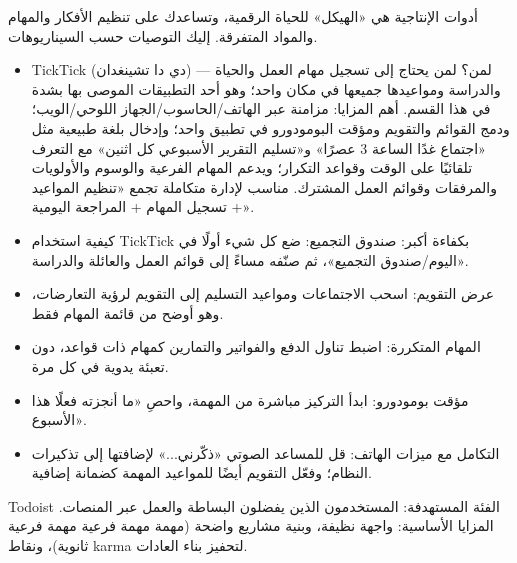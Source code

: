 


أدوات الإنتاجية هي «الهيكل» للحياة الرقمية، وتساعدك على تنظيم الأفكار والمهام والمواد المتفرقة. إليك التوصيات حسب السيناريوهات.


\begin{itemize}
  \item TickTick (دي دا تشينغدان) — لمن؟ لمن يحتاج إلى تسجيل مهام العمل والحياة والدراسة ومواعيدها جميعها في مكان واحد؛ وهو أحد التطبيقات الموصى بها بشدة في هذا القسم. أهم المزايا: مزامنة عبر الهاتف/الحاسوب/الجهاز اللوحي/الويب؛ ودمج القوائم والتقويم ومؤقت البومودورو في تطبيق واحد؛ وإدخال بلغة طبيعية مثل «اجتماع غدًا الساعة 3 عصرًا» و«تسليم التقرير الأسبوعي كل اثنين» مع التعرف تلقائيًا على الوقت وقواعد التكرار؛ ويدعم المهام الفرعية والوسوم والأولويات والمرفقات وقوائم العمل المشترك. مناسب لإدارة متكاملة تجمع «تنظيم المواعيد + تسجيل المهام + المراجعة اليومية».
  \item كيفية استخدام TickTick بكفاءة أكبر: صندوق التجميع: ضع كل شيء أولًا في «اليوم/صندوق التجميع»، ثم صنّفه مساءً إلى قوائم العمل والعائلة والدراسة.
  \item عرض التقويم: اسحب الاجتماعات ومواعيد التسليم إلى التقويم لرؤية التعارضات، وهو أوضح من قائمة المهام فقط.
  \item المهام المتكررة: اضبط تناول الدفع والفواتير والتمارين كمهام ذات قواعد، دون تعبئة يدوية في كل مرة.
  \item مؤقت بومودورو: ابدأ التركيز مباشرة من المهمة، واحصِ «ما أنجزته فعلًا هذا الأسبوع».
  \item التكامل مع ميزات الهاتف: قل للمساعد الصوتي «ذكّرني...» لإضافتها إلى تذكيرات النظام؛ وفعّل التقويم أيضًا للمواعيد المهمة كضمانة إضافية.
\end{itemize}

Todoist الفئة المستهدفة: المستخدمون الذين يفضلون البساطة والعمل عبر المنصات. المزايا الأساسية: واجهة نظيفة، وبنية مشاريع واضحة (مهمة مهمة فرعية مهمة فرعية ثانوية)، ونقاط karma لتحفيز بناء العادات.

